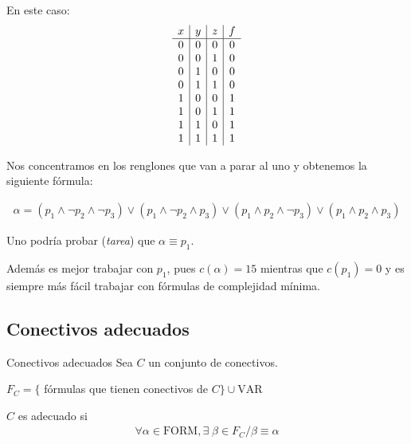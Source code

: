 \begin{enumerate}
        En este caso:
        \begin{gather*}
            \begin{array}{c | c | c | c}
                x & y & z & f \\
                \hline 
                0 & 0 & 0 & 0 \\
                0 & 0 & 1 & 0 \\
                0 & 1 & 0 & 0 \\
                0 & 1 & 1 & 0 \\
                1 & 0 & 0 & 1 \\
                1 & 0 & 1 & 1  \\
                1 & 1 & 0 & 1  \\
                1 & 1 & 1 & 1 
            \end{array}
        \end{gather*}

        Nos concentramos en los renglones que van a parar al uno y
        obtenemos la siguiente fórmula:

        \begin{gather*}
            \alpha = (p_1 \wedge \neg p_2 \wedge \neg p_3) \vee
            (p_1 \wedge \neg p_2 \wedge p_3) \vee 
            (p_1 \wedge p_2 \wedge \neg p_3) \vee (p_1 \wedge p_2 \wedge p_3)
        \end{gather*}

        \medskip
        Uno podría probar (\textit{tarea}) que $\alpha \equiv p_1$.

        Además es mejor trabajar con $p_1$, pues $c(\alpha) = 15$ mientras 
        que $c(p_1) = 0$ y es siempre más fácil trabajar con fórmulas de 
        complejidad mínima.
\end{enumerate}

\subsection{Conectivos adecuados}

\begin{definicion}{Conectivos adecuados}{}
    Sea $C$ un conjunto de conectivos. 

    $F_C = \{$ fórmulas que tienen conectivos de $ C \} \cup \mathrm{VAR}$

    \medskip

    $C$ es adecuado si 
    \begin{gather*}
        \forall \alpha \in \mathrm{FORM}, \exists \; \beta \in F_C / 
        \beta \equiv \alpha
    \end{gather*}

\end{definicion}

